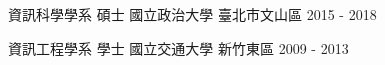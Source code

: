 

\begin{cventries}

  \cventry
    {資訊科學學系 碩士} %
    {國立政治大學} %
    {臺北市文山區} %
    {2015 - 2018} %
    {
    }

  \cventry
    {資訊工程學系 學士} %
    {國立交通大學} %
    {新竹東區} %
    {2009 - 2013} %
    {
    }

\end{cventries}
